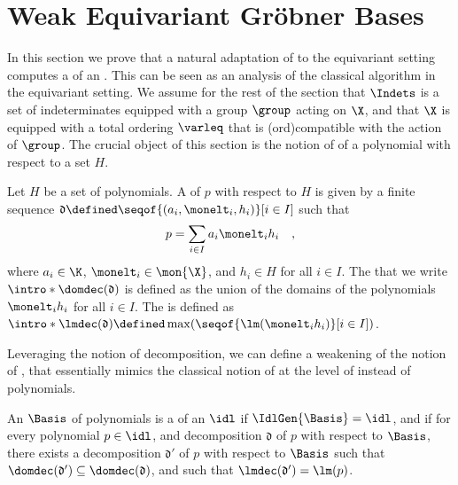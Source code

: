 \section{Weak Equivariant Gröbner Bases}
\label{sec:weakgb}

\AP In this section we prove that a natural adaptation of  to the equivariant setting computes a  of an . This can be seen as an analysis of the
classical algorithm in the equivariant setting. We assume for the rest of
the section that $\Indets$ is a set of indeterminates equipped with a group
$\group$ acting  on $\X$, and that $\X$ is
equipped with a total ordering $\varleq$ that is \kl(ord){compatible} with the
action of $\group$. The crucial object of this section is the notion of
 of a polynomial with respect to a set $H$.

\begin{definition}
  \label{def:decomposition}
  Let $H$ be a set of polynomials. A  of $p$
  with respect to $H$ is given by a finite sequence 
  $\mathfrak{d} \defined \seqof{(a_i, \monelt_i, h_i)}[i \in I]$ such that
  \begin{equation}
    p = \sum_{i \in I} a_i \monelt_i h_i \quad ,
  \end{equation}
  where $a_i \in \K$, $\monelt_i \in \mon{\X}$, and $h_i \in H$ for all $i \in I$.
  The 
  that we write $\intro*\domdec(\mathfrak{d})$ is defined as the union
  of the domains of the polynomials $\monelt_i h_i$ for all $i \in I$.
  The  is defined as
  $
    \intro*\lmdec(\mathfrak{d}) \defined \max(\seqof{\lm(\monelt_i h_i)}[i \in I])
  $.
\end{definition}

Leveraging the notion of decomposition, we can define a weakening of the notion
of , that essentially mimics the classical notion
of  at the level of  instead
of polynomials.

\begin{definition}
  An  $\Basis$ of polynomials is 
  a  of an 
  $\idl$ if $\IdlGen{\Basis} = \idl$, and if for every polynomial $p \in \idl$,
  and decomposition $\mathfrak{d}$ of $p$ with respect to $\Basis$, there
  exists a decomposition $\mathfrak{d}'$ of $p$ with respect to $\Basis$ such that
  $\domdec(\mathfrak{d}') \subseteq \domdec(\mathfrak{d})$,
  and 
  such that $\lmdec(\mathfrak{d}') = \lm(p)$.
\end{definition}

